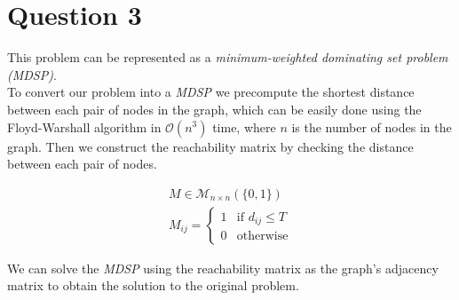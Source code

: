 \section{Question 3}

This problem can be represented as a \textit{minimum-weighted dominating set problem (MDSP)}.  \\

To convert our problem into a \textit{MDSP} we precompute the shortest distance between each pair of nodes in the graph, which can be easily done using the Floyd-Warshall algorithm in $\mathcal{O}(n^3)$ time, where $n$ is the number of nodes in the graph.
Then we construct the reachability matrix by checking the distance between each pair of nodes.

\begin{align*}
	M \in \mathcal{M}_{n \times n} (\{0, 1\})  \\
	M_{ij} = \begin{cases}
		1 & \text{if } d_{ij} \leq T \\
		0 & \text{otherwise}
	\end{cases}
\end{align*}

We can solve the \textit{MDSP} using the reachability matrix as the graph's adjacency matrix to obtain the solution to the original problem.
